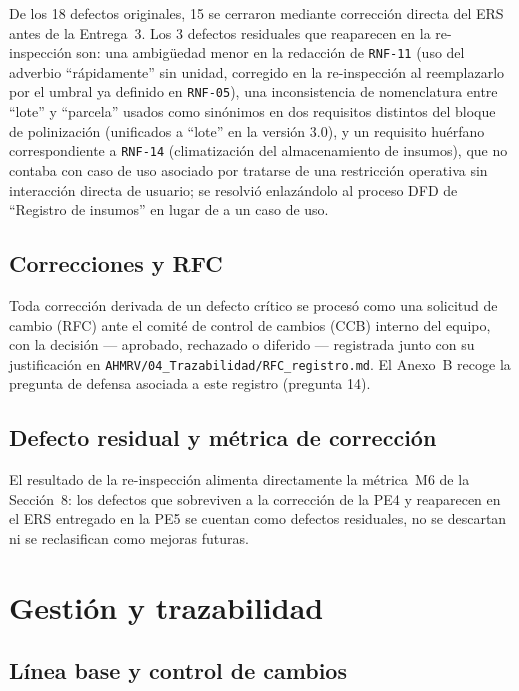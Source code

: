 \documentclass[11pt,a4paper]{article}
\newcommand{\id}[1]{\texttt{#1}}
\begin{document}
De los 18 defectos originales, 15 se cerraron mediante corrección directa del ERS antes de la
Entrega~3. Los 3 defectos residuales que reaparecen en la re-inspección son: una ambigüedad menor
en la redacción de \id{RNF-11} (uso del adverbio ``rápidamente'' sin unidad, corregido en la
re-inspección al reemplazarlo por el umbral ya definido en \id{RNF-05}), una inconsistencia de
nomenclatura entre ``lote'' y ``parcela'' usados como sinónimos en dos requisitos distintos del
bloque de polinización (unificados a ``lote'' en la versión 3.0), y un requisito huérfano
correspondiente a \id{RNF-14} (climatización del almacenamiento de insumos), que no contaba con
caso de uso asociado por tratarse de una restricción operativa sin interacción directa de usuario;
se resolvió enlazándolo al proceso DFD de ``Registro de insumos'' en lugar de a un caso de uso.

\subsection{Correcciones y RFC}

Toda corrección derivada de un defecto crítico se procesó como una solicitud de cambio (RFC) ante
el comité de control de cambios (CCB) interno del equipo, con la decisión --- aprobado, rechazado
o diferido --- registrada junto con su justificación en \id{AHMRV/04\_Trazabilidad/RFC\_registro.md}. El
Anexo~B recoge la pregunta de defensa asociada a este registro (pregunta 14).

\subsection{Defecto residual y métrica de corrección}

El resultado de la re-inspección alimenta directamente la métrica~M6 de la Sección~8: los defectos
que sobreviven a la corrección de la PE4 y reaparecen en el ERS entregado en la PE5 se cuentan como
defectos residuales, no se descartan ni se reclasifican como mejoras futuras.

\section{Gestión y trazabilidad}
\label{sec:trazabilidad}

\subsection{Línea base y control de cambios}
\end{document}
